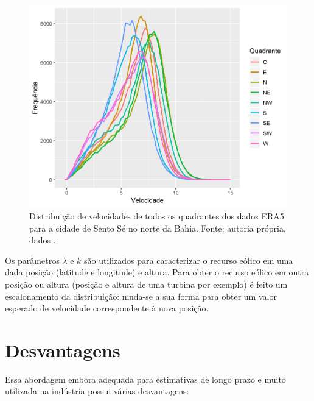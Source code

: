 \documentclass[
	12pt,				%
	openright,			%
	oneside,			%
	a4paper,			%
	english,			%
	french,				%
	spanish,			%
	brazil				%
	]{abntex2}
\begin{document}
\begin{figure}[h]
    \centering
	\includegraphics[scale=0.85]{weibull_freqpoly}
	\caption{Distribuição de velocidades de todos os quadrantes dos dados ERA5 \cite{era5} para a cidade de Sento Sé no norte da Bahia. Fonte: autoria própria, dados \cite{era5}.}
\end{figure}
\FloatBarrier

Os parâmetros $\lambda$ e $k$ são utilizados para caracterizar o recurso eólico em uma dada posição (latitude e longitude) e altura. Para obter o recurso eólico em outra posição ou altura (posição e altura de uma turbina por exemplo) é feito um escalonamento da distribuição: muda-se a sua forma para obter um valor esperado de velocidade correspondente à nova posição.

\section{Desvantagens}

Essa abordagem embora adequada para estimativas de longo prazo e muito utilizada na indústria possui várias desvantagens:
\end{document}
